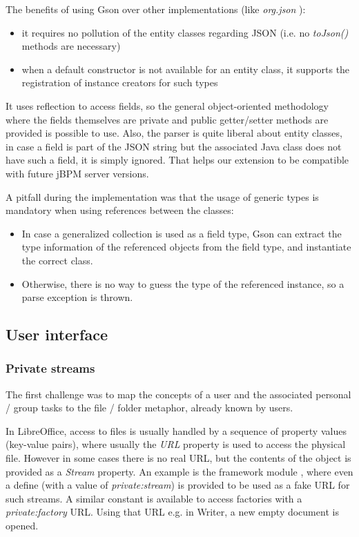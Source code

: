 The benefits of using Gson over other implementations (like
\emph{org.json} \cite{org-json}):

\begin{itemize}
\item it requires no pollution of the entity classes regarding JSON (i.e. no \emph{toJson()} methods are necessary)
\item when a default constructor is not available for an entity class, it supports the registration of instance creators for such types
\end{itemize}

It uses reflection to access fields, so the general object-oriented methodology
where the fields themselves are private and public getter/setter methods are
provided is possible to use. Also, the parser is quite liberal about entity
classes, in case a field is part of the JSON string but the associated Java
class does not have such a field, it is simply ignored. That helps our
extension to be compatible with future jBPM server versions.

A pitfall during the implementation was that the usage of generic types is
mandatory when using references between the classes:

\begin{itemize}
\item In case a generalized collection is used as a field type, Gson can extract the type information of the referenced objects from the field type, and instantiate the correct class.
\item Otherwise, there is no way to guess the type of the referenced instance, so a parse exception is thrown.
\end{itemize}

\subsection{User interface}

\subsubsection*{Private streams}

The first challenge was to map the concepts of a user and the associated
personal / group tasks to the file / folder metaphor, already known by users.

In LibreOffice, access to files is usually handled by a sequence of property
values (key-value pairs), where usually the \emph{URL} property is used to
access the physical file. However in some cases there is no real URL, but the
contents of the object is provided as a \emph{Stream} property.  An example is
the framework module \cite{lo-framework-module}, where even a define (with a
value of \emph{private:stream}) is provided to be used as a fake URL for such
streams.  A similar constant is available to access factories with a
\emph{private:factory} URL. Using that URL e.g. in Writer, a new empty document
is opened.

